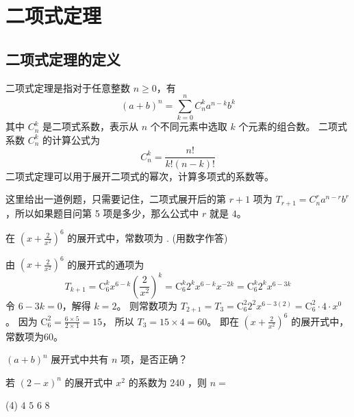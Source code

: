 \section{二项式定理}

\subsection{二项式定理的定义}

\begin{definition}
    二项式定理是指对于任意整数 $n \geq 0$，有
    \[
        (a + b)^n = \sum_{k=0}^{n} C_n^k a^{n-k} b^k
    \]
    其中 $C_n^k$ 是二项式系数，表示从 $n$ 个不同元素中选取 $k$ 个元素的组合数。
    二项式系数 $C_n^k$ 的计算公式为
    \[
        C_n^k = \frac{n!}{k!(n-k)!}
    \]
    二项式定理可以用于展开二项式的幂次，计算多项式的系数等。
\end{definition}

这里给出一道例题，只需要记住，二项式展开后的第 $r+1$ 项为 $T_{r+1} = C_n^r a^{n-r} b^r$，所以如果题目问第 5 项是多少，那么公式中 $r$ 就是 $4$。

\begin{example}
    在 $\left(x+\frac{2}{x^{2}}\right)^{6}$ 的展开式中，常数项为 \underline{\hspace{2cm}}. (用数字作答)
\end{example}

\begin{solution}
    由 $\left(x+\frac{2}{x^{2}}\right)^{6}$ 的展开式的通项为
    $$T_{k+1} = \mathrm{C}_{6}^{k} x^{6-k} \left(\frac{2}{x^{2}}\right)^{k} = \mathrm{C}_{6}^{k} 2^{k} x^{6-k} x^{-2k} = \mathrm{C}_{6}^{k} 2^{k} x^{6-3k}$$
    令 $6-3k=0$，解得 $k=2$。
    则常数项为 $T_{2+1} = T_{3} = \mathrm{C}_{6}^{2} 2^{2} x^{6-3(2)} = \mathrm{C}_{6}^{2} \cdot 4 \cdot x^{0}$。
    因为 $\mathrm{C}_{6}^{2} = \frac{6 \times 5}{2 \times 1} = 15$，
    所以 $T_{3} = 15 \times 4 = 60$。
    即在 $\left(x+\frac{2}{x^{2}}\right)^{6}$ 的展开式中，常数项为60。
\end{solution}

\vspace{0.8cm}

\begin{problem}
$(a+b)^n$ 展开式中共有 $n$ 项，是否正确？
\end{problem}

\vspace{0.8cm}

\begin{example}
    若 $(2-x)^{n}$ 的展开式中 $x^{2}$ 的系数为 240 ，则 $n=$
    \begin{tasks}(4)
        \task $4$
        \task $5$
        \task $6$
        \task $8$
    \end{tasks}
\end{example}

